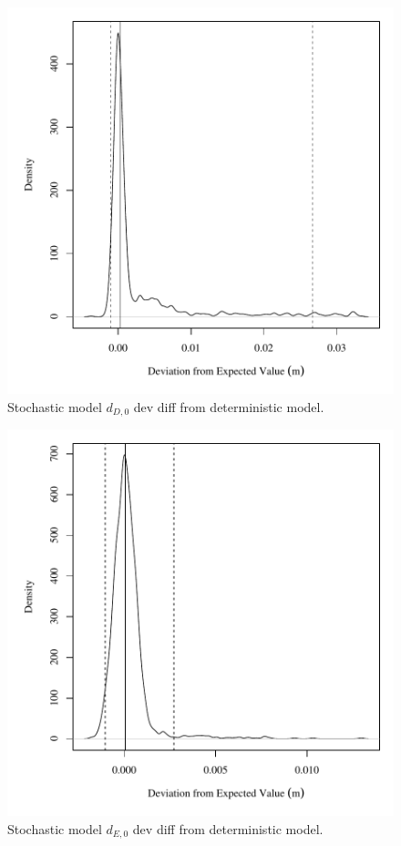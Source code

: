 \begin{center}
\begin{figure}[htbp]
	\includegraphics[width=6in]{"Figures/Results_USR/V dev diff depthD1"}
	\caption{Stochastic model $d_{D,0}$ dev diff from deterministic model.}
\end{figure}
\end{center}
\newpage

\begin{center}
\begin{figure}[htbp]
	\includegraphics[width=6in]{"Figures/Results_USR/V dev diff depthE1"}
	\caption{Stochastic model $d_{E,0}$ dev diff from deterministic model.}
\end{figure}
\end{center}
\newpage

